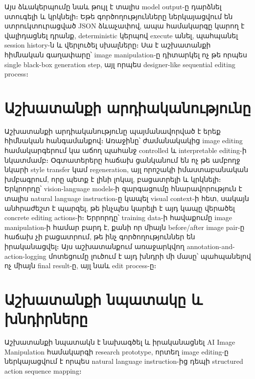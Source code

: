 \documentclass[12pt,a4paper]{report}
\newcommand{\Eng}[1]{\textenglish{#1}}
\begin{document}
Այս ձևակերպումը նաև թույլ է տալիս model output-ը դարձնել ստուգելի և կրկնելի։ Եթե գործողությունները ներկայացվում են ստրուկտուրացված JSON ձևաչափով, ապա համակարգը կարող է վալիդացնել դրանք, deterministic կերպով execute անել, պահպանել session history-ն և վերլուծել սխալները։ Սա է աշխատանքի հիմնական գաղափարը՝ image manipulation-ը դիտարկել ոչ թե որպես single black-box generation step, այլ որպես designer-like sequential editing process։

\section*{Աշխատանքի արդիականությունը}

Աշխատանքի արդիականությունը պայմանավորված է երեք հիմնական հանգամանքով։ Առաջինը՝ ժամանակակից image editing համակարգերում կա աճող պահանջ controlled և interpretable editing-ի նկատմամբ։ Օգտատերերը հաճախ ցանկանում են ոչ թե ամբողջ նկարի style transfer կամ regeneration, այլ որոշակի իմաստաբանական խմբագրում, որը պետք է լինի լոկալ, բացատրելի և կրկնելի։ Երկրորդը՝ \Eng{vision-language models}-ի զարգացումը հնարավորություն է տալիս natural language instruction-ը կապել visual context-ի հետ, սակայն անհրաժեշտ է պարզել, թե ինչպես կարելի է այդ կապը վերածել concrete editing actions-ի։ Երրորդը՝ training data-ի հավաքումը image manipulation-ի համար բարդ է, քանի որ միայն before/after image pair-ը հաճախ չի բացատրում, թե ինչ գործողություններ են իրականացվել։ Այս աշխատանքում առաջարկվող annotation-and-action-logging մոտեցումը լուծում է այդ խնդրի մի մասը՝ պահպանելով ոչ միայն final result-ը, այլ նաև edit process-ը։

\section*{Աշխատանքի նպատակը և խնդիրները}

Աշխատանքի նպատակն է նախագծել և իրականացնել \Eng{AI Image Manipulation} համակարգի research prototype, որտեղ image editing-ը ներկայացվում է որպես natural language instruction-ից դեպի structured action sequence mapping։
\end{document}
